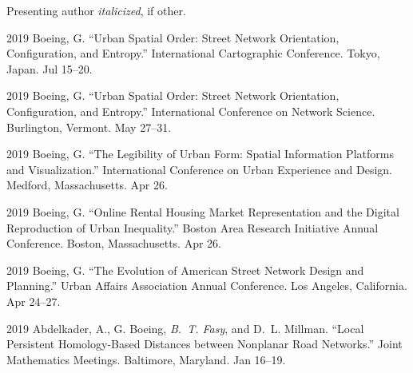 \documentclass[12pt,letterpaper]{report}
\begin{document}
	Presenting author \textit{italicized}, if other.\bigskip

	\begin{tablist}



		\item[2019] \tab Boeing, G. \enquote{Urban Spatial Order: Street Network Orientation, Configuration, and Entropy.} International Cartographic Conference. Tokyo, Japan. Jul 15--20.

		\item[2019] \tab Boeing, G. \enquote{Urban Spatial Order: Street Network Orientation, Configuration, and Entropy.} International Conference on Network Science. Burlington, Vermont. May 27--31.

		\item[2019] \tab Boeing, G. \enquote{The Legibility of Urban Form: Spatial Information Platforms and Visualization.} International Conference on Urban Experience and Design. Medford, Massachusetts. Apr 26.

		\item[2019] \tab Boeing, G. \enquote{Online Rental Housing Market Representation and the Digital Reproduction of Urban Inequality.} Boston Area Research Initiative Annual Conference. Boston, Massachusetts. Apr 26.

		\item[2019] \tab Boeing, G. \enquote{The Evolution of American Street Network Design and Planning.} Urban Affairs Association Annual Conference. Los Angeles, California. Apr 24--27.

		\item[2019] \tab Abdelkader, A., G. Boeing, \textit{B.~T. Fasy}, and D.~L. Millman. \enquote{Local Persistent Homology-Based Distances between Nonplanar Road Networks.} Joint Mathematics Meetings. Baltimore, Maryland. Jan 16--19.


\end{tablist}
\end{document}
